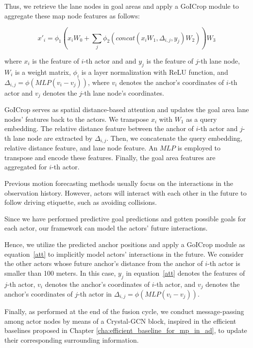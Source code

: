 Thus, we retrieve the lane nodes in goal areas and apply a GoICrop module to aggregate these map node features as follows:

\begin{equation}
	x'_i = \phi_1(x_iW_0+\sum_j\phi_2(concat(x_iW_1,\Delta_{i,j},y_j)W_2))W_3
	\label{att}
\end{equation}

where $x_i$ is the feature of $i$-th actor and and $y_j$ is the feature of $j$-th lane node, $W_i$ is a weight matrix, $\phi_i$ is a layer normalization with ReLU function, and $\Delta_{i,j}=\phi(MLP(v_i-v_j))$, where $v_i$ denotes the anchor's coordinates of $i$-th actor and $v_j$ denotes the $j$-th lane node's coordinates.
 
GoICrop serves as spatial distance-based attention and updates the goal area lane nodes' features back to the actors. We transpose $x_i$ with $W_1$ as a query embedding. The relative distance feature between the anchor of $i$-th actor and $j$-th lane node are extracted by $\Delta_{i,j}$. Then, we concatenate the query embedding, relative distance feature, and lane node feature. An $MLP$ is employed to transpose and encode these features. Finally, the goal area features are aggregated for $i$-th actor.

Previous motion forecasting methods usually focus on the interactions in the observation history. 
However, actors will interact with each other in the future to follow driving etiquette, such as avoiding collisions. 

Since we have performed predictive goal predictions and gotten possible goals for each actor, our framework can model the actors' future interactions.

Hence, we utilize the predicted anchor positions and apply a GoICrop module as equation~\ref{att} to implicitly model actors' interactions in the future. We consider the other actors whose future anchor's distance from the anchor of $i$-th actor is smaller than 100 meters. In this case, $y_j$ in equation~\ref{att} denotes the features of $j$-th actor, $v_i$ denotes the anchor's coordinates of $i$-th actor, and $v_j$ denotes the anchor's coordinates of $j$-th actor in $\Delta_{i,j}=\phi(MLP(v_i-v_j))$.

Finally, as performed at the end of the fusion cycle, we conduct message-passing among actor nodes by means of a Crystal-\ac{GCN} block, inspired in the efficient baselines proposed in Chapter \ref{cha:efficient_baseline_for_mp_in_ad}, to update their corresponding surrounding information.

